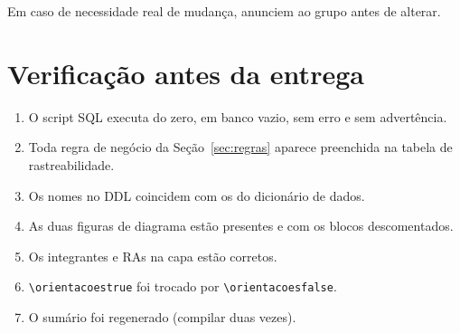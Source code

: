 \documentclass[a4paper,12pt,oneside,openany]{book}
\newif\iforientacoes
\begin{document}
Em caso de necessidade real de mudança, anunciem ao grupo antes de alterar.

\section{Verificação antes da entrega}

\begin{enumerate}[nosep]
    \item O script SQL executa do zero, em banco vazio, sem erro e sem
    advertência.
    \item Toda regra de negócio da Seção~\ref{sec:regras} aparece preenchida na
    tabela de rastreabilidade.
    \item Os nomes no DDL coincidem com os do dicionário de dados.
    \item As duas figuras de diagrama estão presentes e com os blocos
    descomentados.
    \item Os integrantes e RAs na capa estão corretos.
    \item \verb|\orientacoestrue| foi trocado por \verb|\orientacoesfalse|.
    \item O sumário foi regenerado (compilar duas vezes).
\end{enumerate}
\fi
\end{document}
